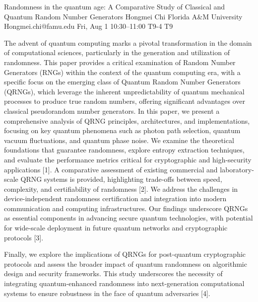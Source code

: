 \begin{talk}
  {Randomness in the quantum age: A Comparative Study of Classical and Quantum Random Number Generators}%
  {Hongmei Chi}%
  {Florida A\&M University}%
  {Hongmei.chi@famu.edu}%
  {}%
  {}%
  {Fri, Aug 1 10:30--11:00}%
  {T9-4}%
  {T9}%
 
     
The advent of quantum computing marks a pivotal transformation in the domain of computational sciences, particularly in the generation and utilization of randomness. This paper provides a critical examination of Random Number Generators (RNGs) within the context of the quantum computing era, with a specific focus on the emerging class of Quantum Random Number Generators (QRNGs), which leverage the inherent unpredictability of quantum mechanical processes to produce true random numbers, offering significant advantages over classical pseudorandom number generators. 
In this paper, we present a comprehensive analysis of QRNG principles, architectures, and implementations, focusing on key quantum phenomena such as photon path selection, quantum vacuum fluctuations, and quantum phase noise. We examine the theoretical foundations that guarantee randomness, explore entropy extraction techniques, and evaluate the performance metrics critical for cryptographic and high-security applications [1]. A comparative assessment of existing commercial and laboratory-scale QRNG systems is provided, highlighting trade-offs between speed, complexity, and certifiability of randomness [2].  We address the challenges in device-independent randomness certification and integration into modern communication and computing infrastructures. Our findings underscore QRNGs as essential components in advancing secure quantum technologies, with potential for wide-scale deployment in future quantum networks and cryptographic protocols [3].

 Finally, we explore the implications of QRNGs for post-quantum cryptographic protocols and assess the broader impact of quantum randomness on algorithmic design and security frameworks. This study underscores the necessity of integrating quantum-enhanced randomness into next-generation computational systems to ensure robustness in the face of quantum adversaries [4].


\end{talk}
